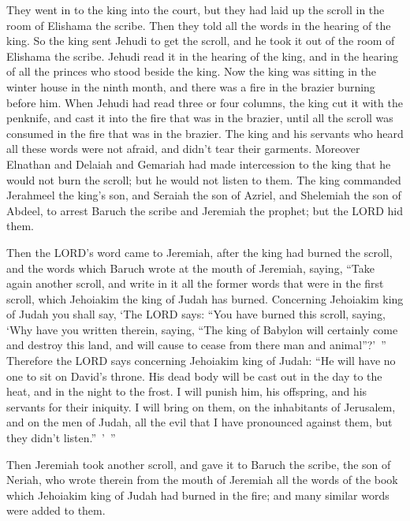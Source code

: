 \myverse{}They went in to the king into the court, but they had laid up the scroll in the room of Elishama the scribe. Then they told all the words in the hearing of the king. \myverse{}So the king sent Jehudi to get the scroll, and he took it out of the room of Elishama the scribe. Jehudi read it in the hearing of the king, and in the hearing of all the princes who stood beside the king. \myverse{}Now the king was sitting in the winter house in the ninth month, and there was a fire in the brazier burning before him. \myverse{}When Jehudi had read three or four columns, the king cut it with the penknife, and cast it into the fire that was in the brazier, until all the scroll was consumed in the fire that was in the brazier. \myverse{}The king and his servants who heard all these words were not afraid, and didn’t tear their garments. \myverse{}Moreover Elnathan and Delaiah and Gemariah had made intercession to the king that he would not burn the scroll; but he would not listen to them. \myverse{}The king commanded Jerahmeel the king’s son, and Seraiah the son of Azriel, and Shelemiah the son of Abdeel, to arrest Baruch the scribe and Jeremiah the prophet; but the LORD hid them.


\myverse{}Then the LORD’s word came to Jeremiah, after the king had burned the scroll, and the words which Baruch wrote at the mouth of Jeremiah, saying, \myverse{}“Take again another scroll, and write in it all the former words that were in the first scroll, which Jehoiakim the king of Judah has burned. \myverse{}Concerning Jehoiakim king of Judah you shall say, ‘The LORD says: “You have burned this scroll, saying, ‘Why have you written therein, saying, “The king of Babylon will certainly come and destroy this land, and will cause to cease from there man and animal”?’ ” \myverse{}Therefore the LORD says concerning Jehoiakim king of Judah: “He will have no one to sit on David’s throne. His dead body will be cast out in the day to the heat, and in the night to the frost. \myverse{}I will punish him, his offspring, and his servants for their iniquity. I will bring on them, on the inhabitants of Jerusalem, and on the men of Judah, all the evil that I have pronounced against them, but they didn’t listen.” ’ ”


\myverse{}Then Jeremiah took another scroll, and gave it to Baruch the scribe, the son of Neriah, who wrote therein from the mouth of Jeremiah all the words of the book which Jehoiakim king of Judah had burned in the fire; and many similar words were added to them.


